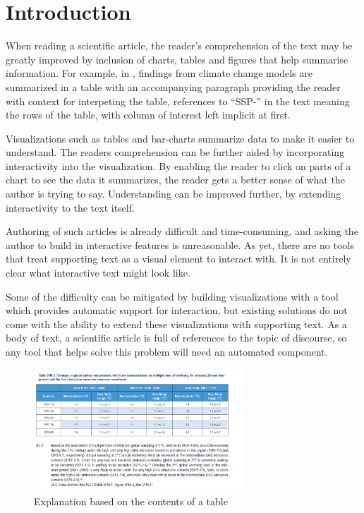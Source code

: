 \section{Introduction}

When reading a scientific article, the reader's comprehension of the text may
be greatly improved by inclusion of charts, tables and figures that help summarise information.
For example, in , findings from climate change models
are summarized in a table with an accompanying paragraph providing the reader
with context for interpeting the table, references to ``SSP-'' in the text meaning
the rows of the table, with column of interest left implicit at first.

Visualizations such as tables and bar-charts summarize data to make it easier to
understand. The readers comprehension can be further aided by incorporating 
interactivity into the visualization. By enabling the reader to click on parts
of a chart to see the data it summarizes, the reader gets a better sense of what
the author is trying to say. Understanding can be improved further, by extending
interactivity to the text itself.

Authoring of such articles is already difficult and time-consuming, and asking
the author to build in interactive features is unreasonable. As yet, there are
no tools that treat supporting text as a visual element to interact with. It is
not entirely clear what interactive text might look like. 

Some of the difficulty can be mitigated by building visualizations with a tool
which provides automatic support for interaction, but existing solutions do
not come with the ability to extend these visualizations with supporting text.
As a body of text, a scientific article is full of references to the topic of
discourse, so any tool that helps solve this problem will need an automated
component.

\begin{figure}[h]
   \includegraphics[width=0.7\textwidth]{fig/ipcc-table-explanation.png}
   \caption{Explanation based on the contents of a table}
   \label{fig:table-explanation}
\end{figure}